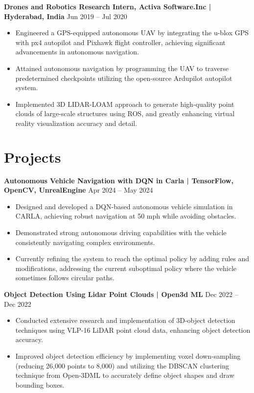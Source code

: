 \documentclass[a4paper,10pt]{article}
\begin{document}
\noindent\textbf{Drones and Robotics Research Intern, Activa Software.Inc  | Hyderabad, India} \hfill Jun 2019 – Jul 2020
\begin{itemize}
    \item Engineered a GPS-equipped autonomous UAV by integrating the u-blox GPS with px4 autopilot and Pixhawk flight controller, achieving significant advancements in autonomous navigation.
    \item Attained autonomous navigation by programming the UAV to traverse predetermined checkpoints utilizing the open-source Ardupilot autopilot system.
    \item Implemented 3D LIDAR-LOAM approach to generate high-quality point clouds of large-scale structures using ROS, and greatly enhancing virtual reality visualization accuracy and detail.
\end{itemize}

\section*{Projects}
\noindent\textbf{Autonomous Vehicle Navigation with DQN in Carla | TensorFlow, OpenCV, UnrealEngine} \hfill Apr 2024 – May 2024
\begin{itemize}
    \item Designed and developed a DQN-based autonomous vehicle simulation in CARLA, achieving robust navigation at 50 mph while avoiding obstacles.
    \item Demonstrated strong autonomous driving capabilities with the vehicle consistently navigating complex environments.
    \item Currently refining the system to reach the optimal policy by adding rules and modifications, addressing the current suboptimal policy where the vehicle sometimes follows circular paths.
\end{itemize}

\noindent\textbf{Object Detection Using Lidar Point Clouds | Open3d ML} \hfill Dec 2022 – Dec 2022
\begin{itemize}
    \item Conducted extensive research and implementation of 3D-object detection techniques using VLP-16 LiDAR point cloud data, enhancing object detection accuracy.
    \item Improved object detection efficiency by implementing voxel down-sampling (reducing 26,000 points to 8,000) and utilizing the DBSCAN clustering technique from Open-3DML to accurately define object shapes and draw bounding boxes.
\end{itemize}
\end{document}
